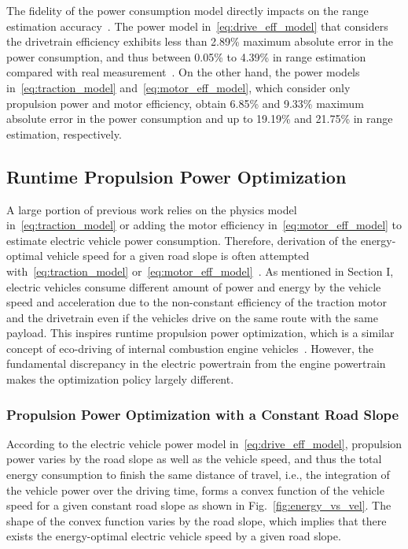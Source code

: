 The fidelity of the power consumption model directly impacts on the range estimation accuracy~\cite{Hong:ASPDAC16}. The power model in~\eqref{eq:drive_eff_model} that considers the drivetrain efficiency exhibits less than 2.89\% maximum absolute error in the power consumption, and thus between 0.05\% to 4.39\% in range estimation compared with real measurement~\cite{Hong:ASPDAC16}. On the other hand, the power models in~\eqref{eq:traction_model} and~\eqref{eq:motor_eff_model}, which consider only propulsion power and motor efficiency, obtain 6.85\% and 9.33\% maximum absolute error in the power consumption and up to 19.19\% and 21.75\% in range estimation, respectively.

\subsection{Runtime Propulsion Power Optimization} \label{subsec:propulsion_runtime_opt}

A large portion of previous work relies on the physics model in~\eqref{eq:traction_model} or adding the motor efficiency in~\eqref{eq:motor_eff_model} to estimate electric vehicle power consumption. Therefore, derivation of the energy-optimal vehicle speed for a given road slope is often attempted with~\eqref{eq:traction_model} or~\eqref{eq:motor_eff_model}~\cite{Wu:TR15,Vaz:JPS14,Lin:CCA14,Oliva:PHM13,Kachroudi:TVT12}.
As mentioned in Section I, electric vehicles consume different amount of power and energy by the vehicle speed and acceleration due to the non-constant efficiency of the traction motor and the drivetrain even if the vehicles drive on the same route with the same payload. This inspires runtime propulsion power optimization, which is a similar concept of eco-driving of internal combustion engine vehicles~\cite{Kamal:TITS11,Ozatay:IFAC14,Ozatay:TITS14,Khayyam:ESA12}. However, the fundamental discrepancy in the electric powertrain from the engine powertrain makes the optimization policy largely different.

\subsubsection{Propulsion Power Optimization with a Constant Road Slope} \label{subsubsec:opt_const_slope}

According to the electric vehicle power model in~\eqref{eq:drive_eff_model}, propulsion power varies by the road slope as well as the vehicle speed, and thus the total energy consumption to finish the same distance of travel, i.e., the integration of the vehicle power over the driving time, forms a convex function of the vehicle speed for a given constant road slope as shown in Fig.~\ref{fig:energy_vs_vel}. The shape of the convex function varies by the road slope, which implies that there exists the energy-optimal electric vehicle speed by a given road slope.

